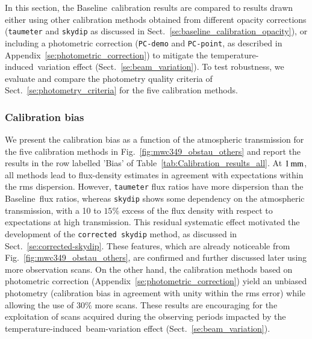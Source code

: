 \documentclass[traditionalabstract]{aa}
\newcommand{\afternoon}{temperature-induced}
\newcommand{\baseline}{Baseline}%
\begin{document}
{In this section, the \baseline\ calibration results are compared to
results drawn either using other calibration methods obtained from different
opacity corrections ({\tt taumeter} and {\tt skydip} as
discussed in Sect.~\ref{se:baseline_calibration_opacity}), or
including a photometric correction ({\tt PC-demo} and {\tt PC-point},
as described in Appendix~\ref{se:photometric_correction}) to mitigate
the \afternoon\ variation effect (Sect.~\ref{se:beam_variation}).
To test robustness, we evaluate and compare the photometry quality criteria of
Sect.~\ref{se:photometry_criteria} for the five calibration methods.


\subsubsection{Calibration bias}
\label{se:calibration_bias_all}

We present the calibration bias as a function of the atmospheric
transmission for the five calibration methods in
Fig.~\ref{fig:mwc349_obstau_others} and report the results in the row
labelled 'Bias' of Table~\ref{tab:Calibration_results_all}.
At $1\,\rm{mm}$, all methods lead to flux-density estimates in
agreement with expectations within the rms dispersion. However,
{\tt taumeter} flux ratios have more dispersion than
the \baseline\ flux ratios, whereas {\tt skydip} shows some
dependency on the atmospheric
transmission, with a 10 to $15\%$ excess of the flux density with
respect to expectations at high transmission. This residual
systematic effect motivated the development of the {\tt corrected
  skydip} method, as discussed in
Sect.~\ref{se:corrected-skydip}. These features, which are
already noticeable from Fig.~\ref{fig:mwc349_obstau_others}, are
confirmed and further discussed later using more observation scans. On
the other hand, the calibration methods based on photometric
correction (Appendix~\ref{se:photometric_correction}) yield an
unbiased photometry (calibration bias in agreement with unity
within the rms error) while allowing the use of $30\%$ more
scans. These results are encouraging for the exploitation of scans
acquired during the observing periods
impacted by the \afternoon\ beam-variation effect
(Sect.~\ref{se:beam_variation}).

}
\end{document}
